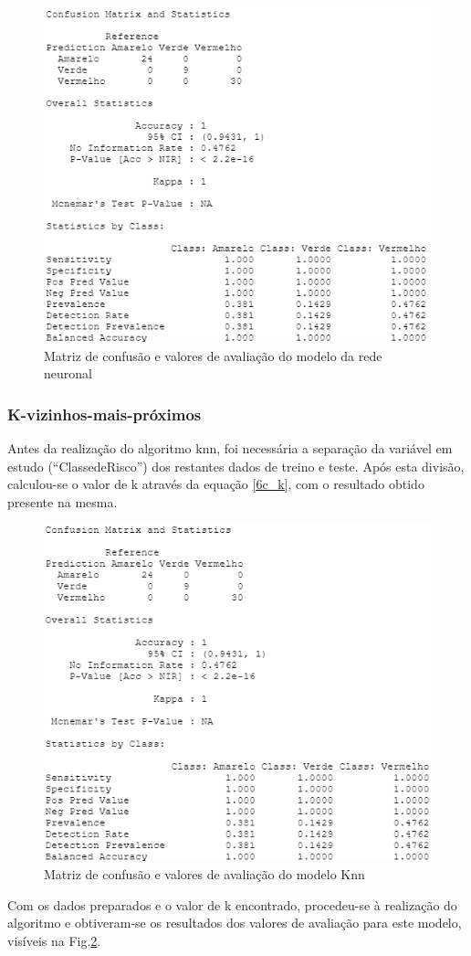 \documentclass[conference]{IEEEtran}
\begin{document}
\begin{figure}[htbp]
\centerline{\includegraphics[width=0.95\columnwidth]{images/08_4.png}}
\caption{Matriz de confusão e valores de avaliação do modelo da rede neuronal}
\label{8b_confusionmatrix}
\end{figure}


\subsubsection{K-vizinhos-mais-próximos}
Antes da realização do algoritmo knn, foi necessária a separação da variável em estudo (“ClassedeRisco”) dos restantes dados de treino e teste. Após esta divisão, calculou-se o valor de k através da equação \eqref{6c_k}, com o resultado obtido presente na mesma.

\begin{figure}[htbp]
\centerline{\includegraphics[width=0.95\columnwidth]{images/08_5.png}}
\caption{Matriz de confusão e valores de avaliação do modelo Knn}
\label{8c_confusionmatrix}
\end{figure}
Com os dados preparados e o valor de k encontrado, procedeu-se à realização do algoritmo e obtiveram-se os resultados dos valores de avaliação para este modelo, visíveis na Fig.\ref{8c_confusionmatrix}.
\end{document}
